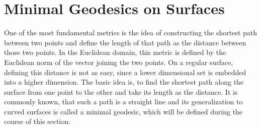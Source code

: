 \section{Minimal Geodesics on Surfaces}
\label{section:geodesic}
One of the most fundamental metrics is the idea of constructing the shortest path between two points and define the length of that path as the distance between those two points.
In the Euclidean domain, this metric is defined by the Euclidean norm of the vector joining the two points.
On a regular surface, defining this distance is not as easy, since a lower dimensional set is embedded into a higher dimension.
The basic idea is, to find the shortest path along the surface from one point to the other and take its length as the distance.
It is commonly known, that such a path is a straight line and its generalization to curved surfaces is called a minimal geodesic, which will be defined during the course of this section.

